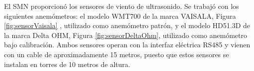 El SMN proporcionó los sensores de viento de ultrasonido. Se trabajó con los siguientes anemómetros: el modelo WMT700 de la marca VAISALA, Figura \ref{fig:sensorVaisala}
, utilizado como anemómetro patrón, y el modelo HD51.3D de la marca Delta OHM, Figura \ref{fig:sensorDeltaOhm}, utilizado como anemómetro bajo calibración. Ambos sensores operan con la interfaz eléctrica RS485 y vienen con un cable de aproximadamente 15 metros, puesto que estos sensores se instalan en torres de 10 metros de altura.

\begin{figure}[H]
    \centering
    
    \begin{minipage}[b]{0.45\textwidth}
    \end{minipage}
    \hspace{1em} %
    \begin{minipage}[b]{0.45\textwidth}

\end{minipage}
\end{figure}

